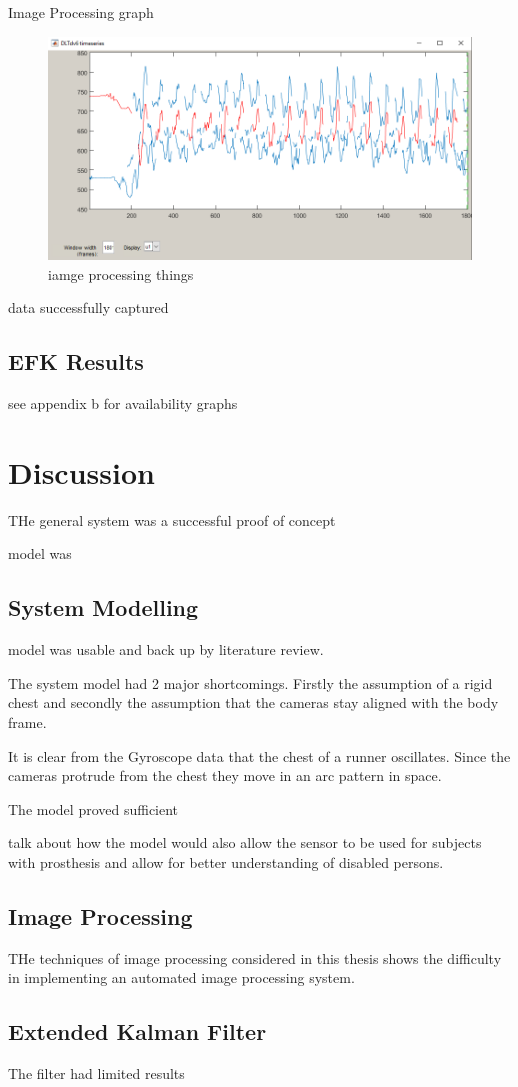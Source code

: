 Image Processing graph

\begin{figure}[!ht] 
\captionsetup{width=0.8\linewidth, font=small}  
\includegraphics[width=0.5\linewidth]{figures/ipdatapattern.png}
\caption{iamge processing things}
\label{fig:ipdatapattern}
\end{figure}

data successfully captured



\subsection{EFK Results}

see appendix b for availability graphs



\section{Discussion}

THe general system was a successful proof of concept

model was

\subsection{System Modelling}
model was usable and back up by literature review.

The system model had 2 major shortcomings. Firstly the assumption of a rigid chest and secondly the assumption that the cameras stay aligned with the body frame.

It is clear from the Gyroscope data that the chest of a runner oscillates. Since the cameras protrude from the chest they move in an arc pattern in space. 

The model proved sufficient

talk about how the model would also allow the sensor to be used for subjects with prosthesis and allow for better understanding of disabled persons.

\subsection{Image Processing}
THe techniques of image processing considered in this thesis shows the difficulty in implementing an automated image processing system.

\subsection{Extended Kalman Filter}
The filter had limited results












